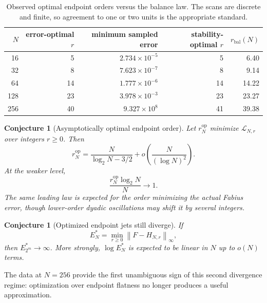 \documentclass[11pt,oneside]{article}
\newtheorem{conjecture}[theorem]{Conjecture}
\theoremstyle{definition}
\theoremstyle{remark}
\newcommand{\norm}[1]{\left\lVert #1\right\rVert}
\begin{document}
\begin{table}[htbp]
\centering
\caption{Observed optimal endpoint orders versus the balance law.  The scans are discrete and finite, so agreement to one or two units is the appropriate standard.}
\label{tab:optimal-r}
\begin{tabular}{rrrrr}
\toprule
$N$ & error-optimal $r$ & minimum sampled error & stability-optimal $r$ & $r_{\mathrm{bal}}(N)$ \\
\midrule
16  & 5  & $2.734\times10^{-5}$ & 5  & 6.40 \\
32  & 8  & $7.623\times10^{-7}$ & 8  & 9.14 \\
64  & 14 & $1.777\times10^{-6}$ & 14 & 14.22 \\
128 & 23 & $3.978\times10^{-3}$ & 23 & 23.27 \\
256 & 40 & $9.327\times10^{8}$ & 41 & 39.38 \\
\bottomrule
\end{tabular}
\end{table}

\begin{conjecture}[Asymptotically optimal endpoint order]
\label{conj:optimal-r}
Let $r_N^{\mathrm{op}}$ minimize $\mathscr L_{N,r}$ over integers $r\ge0$.  Then
\begin{equation}
 r_N^{\mathrm{op}}=\frac{N}{\log_2N-3/2}
 +o\!\left(\frac{N}{(\log N)^2}\right).
 \label{eq:optimal-r-conj}
\end{equation}
At the weaker level,
\begin{equation}
 \frac{r_N^{\mathrm{op}}\log_2N}{N}\longrightarrow1.
 \label{eq:optimal-r-weak}
\end{equation}
The same leading law is expected for the order minimizing the actual Fabius error, though lower-order dyadic oscillations may shift it by several integers.
\end{conjecture}

\begin{conjecture}[Optimized endpoint jets still diverge]
\label{conj:optimized-divergence}
If
\begin{equation}
 E_N^*=\min_{r\ge0}\norm{F-H_{N,r}}_\infty,
\end{equation}
then $E_{2^m}^*\to\infty$.  More strongly, $\log E_N^*$ is expected to be linear in $N$ up to $o(N)$ terms.
\end{conjecture}

The data at $N=256$ provide the first unambiguous sign of this second divergence regime: optimization over endpoint flatness no longer produces a useful approximation.
\end{document}
